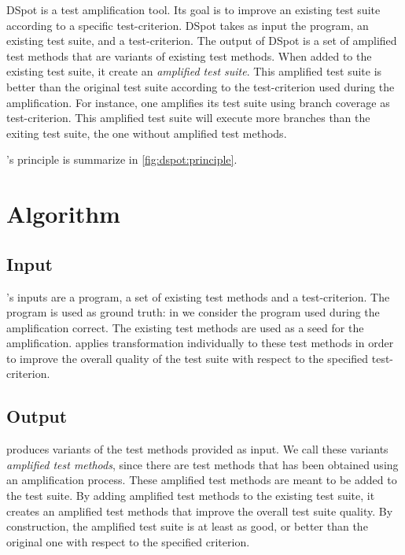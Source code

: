 DSpot is a test amplification tool.
Its goal is to improve an existing test suite according to a specific test-criterion.
DSpot takes as input the program, an existing test suite, and a test-criterion. 
The output of DSpot is a set of amplified test methods that are variants of existing test methods.
When added to the existing test suite, it create an \emph{amplified test suite}.
This amplified test suite is better than the original test suite according to the test-criterion used during the amplification.
For instance, one amplifies its test suite using branch coverage as test-criterion.
This amplified test suite will execute more branches than the exiting test suite, \ie the one without amplified test methods.

\dspot's principle is summarize in \autoref{fig:dspot:principle}.

\section{Algorithm}
\label{sec:dspot:algorithm}

\subsection{Input}
\label{subsec:dspot:algorithm:input}

\dspot's inputs are a program, a set of existing test methods and a test-criterion.
The program is used as ground truth: in \dspot we consider the program used during the amplification correct.
The existing test methods are used as a seed for the amplification.
\dspot applies transformation individually to these test methods in order to improve the overall quality of the test suite with respect to the specified test-criterion.

\subsection{Output}
\label{subsec:dspot:algorithm:output}

\dspot produces variants of the test methods provided as input.
We call these variants \emph{amplified test methods}, since there are test methods that has been obtained using an amplification process.
These amplified test methods are meant to be added to the test suite.
By adding amplified test methods to the existing test suite, it creates an amplified test methods that improve the overall test suite quality.
By construction, the amplified test suite is at least as good, or better than the original one with respect to the specified criterion.

